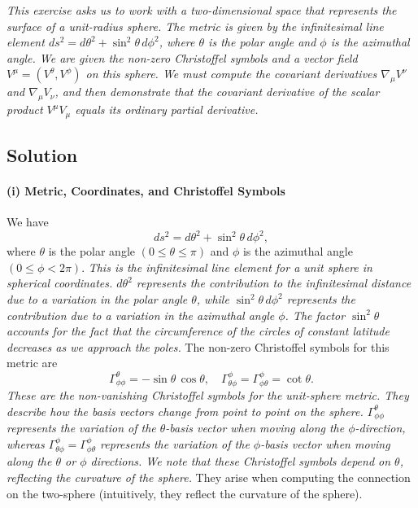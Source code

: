\emph{This exercise asks us to work with a two-dimensional space that represents the surface of a unit-radius sphere. The metric is given by the infinitesimal line element \(ds^2 = d\theta^2 + \sin^2\theta \, d\phi^2\), where \(\theta\) is the polar angle and \(\phi\) is the azimuthal angle. We are given the non-zero Christoffel symbols and a vector field \(V^\mu = (V^\theta, V^\phi)\) on this sphere. We must compute the covariant derivatives \(\nabla_\mu V^\nu\) and \(\nabla_\mu V_\nu\), and then demonstrate that the covariant derivative of the scalar product \(V^\mu V_\mu\) equals its ordinary partial derivative.}

\subsection*{Solution}

\paragraph*{(i) Metric, Coordinates, and Christoffel Symbols}
We have
\[
ds^2 = d\theta^2 + \sin^2\theta \, d\phi^2,
\]
where \(\theta\) is the polar angle \((0 \leq \theta \leq \pi)\) and \(\phi\) is the azimuthal angle \((0 \leq \phi < 2\pi)\).
\emph{This is the infinitesimal line element for a unit sphere in spherical coordinates. \(d\theta^2\) represents the contribution to the infinitesimal distance due to a variation in the polar angle \(\theta\), while \(\sin^2\theta \, d\phi^2\) represents the contribution due to a variation in the azimuthal angle \(\phi\). The factor \(\sin^2\theta\) accounts for the fact that the circumference of the circles of constant latitude decreases as we approach the poles.}
The non-zero Christoffel symbols for this metric are
\[
\Gamma^\theta_{\phi\phi} = -\sin\theta\,\cos\theta,
\quad
\Gamma^\phi_{\theta\phi} = \Gamma^\phi_{\phi\theta} = \cot\theta.
\]
\emph{These are the non-vanishing Christoffel symbols for the unit-sphere metric. They describe how the basis vectors change from point to point on the sphere. \(\Gamma^\theta_{\phi\phi}\) represents the variation of the \(\theta\)-basis vector when moving along the \(\phi\)-direction, whereas \(\Gamma^\phi_{\theta\phi} = \Gamma^\phi_{\phi\theta}\) represents the variation of the \(\phi\)-basis vector when moving along the \(\theta\) or \(\phi\) directions. We note that these Christoffel symbols depend on \(\theta\), reflecting the curvature of the sphere.}
They arise when computing the connection on the two-sphere (intuitively, they reflect the curvature of the sphere).

